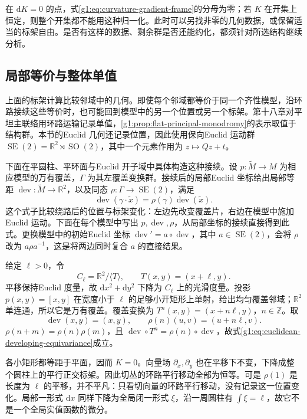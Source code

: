 在 \(\mathrm{d}K=0\) 的点，式\eqref{g1:eq:curvature-gradient-frame}的分母为零；若 \(K\) 在开集上恒定，则整个开集都不能用这种归一化。此时可以另找非零的几何数据，或保留适当的标架自由。是否有这样的数据、剩余群是否还能约化，都须针对所选结构继续分析。

\subsection{局部等价与整体单值}
\label{g1:subsec:D03:03}

上面的标架计算比较邻域中的几何。即使每个邻域都等价于同一个齐性模型，沿环路接续这些等价时，也可能回到模型中的另一个位置或另一个标架。第十八章对平坦主联络用环路运输记录单值，\cref{g1:prop:flat-principal-monodromy}的表示取值于结构群。本节的Euclid 几何还记录位置，因此使用保向Euclid 运动群 \(\operatorname{SE}(2)=\mathbb R^2\rtimes\operatorname{SO}(2)\)，其中一个元素作用为 \(z\mapsto Qz+t\)。

\ProseParagraphBreak

下面在平圆柱、平环面与Euclid 开子域中具体构造这种接续。设 \(p:\widetilde M\to M\) 为相应模型的万有覆盖，\(\Gamma\) 为其左覆盖变换群。接续后的局部Euclid 坐标给出局部等距 \(\operatorname{dev}:\widetilde M\to\mathbb R^2\)，以及同态 \(\rho:\Gamma\to\operatorname{SE}(2)\)，满足
\begin{equation}\label{g1:eq:euclidean-developing-equivariance}
	\operatorname{dev}(\gamma\cdot\widetilde x)
	=\rho(\gamma)\operatorname{dev}(\widetilde x).
\end{equation}
这个式子比较绕路后的位置与标架变化：左边先改变覆盖片，右边在模型中施加Euclid 运动。下面在每个模型中写出 \(p,\operatorname{dev},\rho\)，从局部坐标的接续直接得到此式。更换模型中的初始Euclid 坐标 \(\operatorname{dev}'=a\circ\operatorname{dev}\)，其中 \(a\in\operatorname{SE}(2)\)，会将 \(\rho\) 改为 \(a\rho a^{-1}\)，这是将两边同时复合 \(a\) 的直接结果。

\begin{example}\label{g1:exm:flat-cylinder-developing}
	给定 \(\ell>0\)，令
	\[
		C_\ell=\mathbb R^2/\langle T\rangle,
		\qquad T(x,y)=(x+\ell,y).
	\]
	平移保持Euclid 度量，故 \(\mathrm{d}x^2+\mathrm{d}y^2\) 下降为 \(C_\ell\) 上的光滑度量。投影 \(p(x,y)=[x,y]\) 在宽度小于 \(\ell\) 的足够小开矩形上单射，给出均匀覆盖邻域；\(\mathbb R^2\) 单连通，所以它是万有覆盖。覆盖变换为 \(T^n(x,y)=(x+n\ell,y)\)，\(n\in\mathbb Z\)。取
	\[
		\operatorname{dev}(x,y)=(x,y),\qquad
		\rho(n)(u,v)=(u+n\ell,v).
	\]
	\(\rho(n+m)=\rho(n)\rho(m)\)，且 \(\operatorname{dev}\circ T^n=\rho(n)\circ\operatorname{dev}\)，故式\eqref{g1:eq:euclidean-developing-equivariance}成立。

	各小矩形都等距于平面，因而 \(K=0\)。向量场 \(\partial_x,\partial_y\) 也在平移下不变，下降成整个圆柱上的平行正交标架。因此切丛的环路平行移动全部为恒等。可是 \(\rho(1)\) 是长度为 \(\ell\) 的平移，并不平凡：只看切向量的环路平行移动，没有记录这一位置变化。局部一形式 \(\mathrm{d}x\) 同样下降为全局闭一形式 \(\xi\)，沿一周圆柱有 \(\int\xi=\ell\)，故它不是一个全局实值函数的微分。
\end{example}

